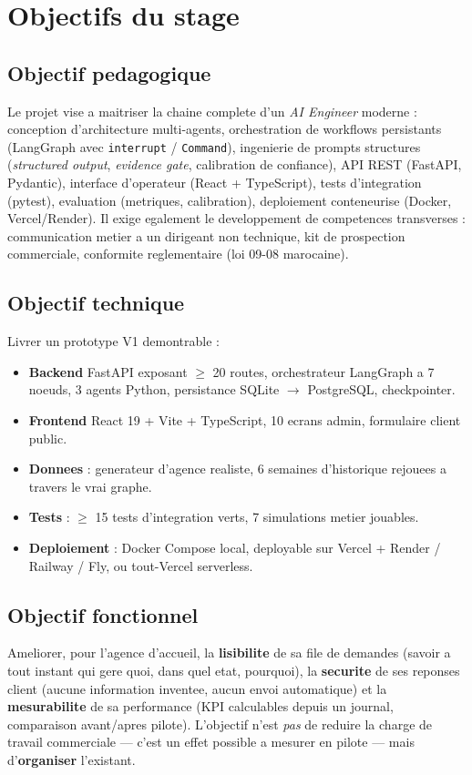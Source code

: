\documentclass[12pt,a4paper,openany]{report}
\begin{document}
\section{Objectifs du stage}

\subsection{Objectif pedagogique}
Le projet vise a maitriser la chaine complete d'un \emph{AI Engineer} moderne : conception d'architecture multi-agents, orchestration de workflows persistants (LangGraph avec \texttt{interrupt} / \texttt{Command}), ingenierie de prompts structures (\emph{structured output}, \emph{evidence gate}, calibration de confiance), API REST (FastAPI, Pydantic), interface d'operateur (React + TypeScript), tests d'integration (pytest), evaluation (metriques, calibration), deploiement conteneurise (Docker, Vercel/Render). Il exige egalement le developpement de competences transverses : communication metier a un dirigeant non technique, kit de prospection commerciale, conformite reglementaire (loi 09-08 marocaine).

\subsection{Objectif technique}
Livrer un prototype V1 demontrable :
\begin{itemize}[leftmargin=1.5cm]
    \item \textbf{Backend} FastAPI exposant $\geq$ 20 routes, orchestrateur LangGraph a 7 noeuds, 3 agents Python, persistance SQLite $\rightarrow$ PostgreSQL, checkpointer.
    \item \textbf{Frontend} React 19 + Vite + TypeScript, 10 ecrans admin, formulaire client public.
    \item \textbf{Donnees} : generateur d'agence realiste, 6 semaines d'historique rejouees a travers le vrai graphe.
    \item \textbf{Tests} : $\geq$ 15 tests d'integration verts, 7 simulations metier jouables.
    \item \textbf{Deploiement} : Docker Compose local, deployable sur Vercel + Render / Railway / Fly, ou tout-Vercel serverless.
\end{itemize}

\subsection{Objectif fonctionnel}
Ameliorer, pour l'agence d'accueil, la \textbf{lisibilite} de sa file de demandes (savoir a tout instant qui gere quoi, dans quel etat, pourquoi), la \textbf{securite} de ses reponses client (aucune information inventee, aucun envoi automatique) et la \textbf{mesurabilite} de sa performance (KPI calculables depuis un journal, comparaison avant/apres pilote). L'objectif n'est \emph{pas} de reduire la charge de travail commerciale --- c'est un effet possible a mesurer en pilote --- mais d'\textbf{organiser} l'existant.
\end{document}
